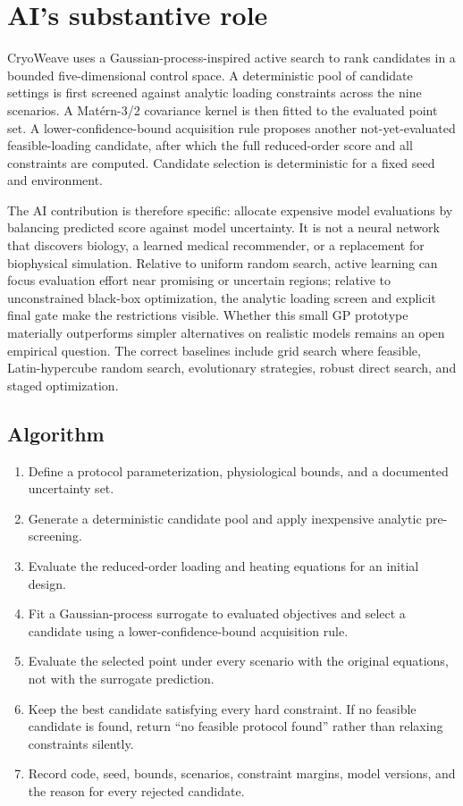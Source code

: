 \documentclass[11pt]{article}
\begin{document}
\section{AI's substantive role}

CryoWeave uses a Gaussian-process-inspired active search to rank candidates in a bounded five-dimensional control space. A deterministic pool of candidate settings is first screened against analytic loading constraints across the nine scenarios. A Mat\'ern-3/2 covariance kernel is then fitted to the evaluated point set. A lower-confidence-bound acquisition rule proposes another not-yet-evaluated feasible-loading candidate, after which the full reduced-order score and all constraints are computed. Candidate selection is deterministic for a fixed seed and environment.

The AI contribution is therefore specific: allocate expensive model evaluations by balancing predicted score against model uncertainty. It is not a neural network that discovers biology, a learned medical recommender, or a replacement for biophysical simulation. Relative to uniform random search, active learning can focus evaluation effort near promising or uncertain regions; relative to unconstrained black-box optimization, the analytic loading screen and explicit final gate make the restrictions visible. Whether this small GP prototype materially outperforms simpler alternatives on realistic models remains an open empirical question. The correct baselines include grid search where feasible, Latin-hypercube random search, evolutionary strategies, robust direct search, and staged optimization.

\subsection{Algorithm}
\begin{enumerate}
\item Define a protocol parameterization, physiological bounds, and a documented uncertainty set.
\item Generate a deterministic candidate pool and apply inexpensive analytic pre-screening.
\item Evaluate the reduced-order loading and heating equations for an initial design.
\item Fit a Gaussian-process surrogate to evaluated objectives and select a candidate using a lower-confidence-bound acquisition rule.
\item Evaluate the selected point under every scenario with the original equations, not with the surrogate prediction.
\item Keep the best candidate satisfying every hard constraint. If no feasible candidate is found, return ``no feasible protocol found'' rather than relaxing constraints silently.
\item Record code, seed, bounds, scenarios, constraint margins, model versions, and the reason for every rejected candidate.
\end{enumerate}
\end{document}
